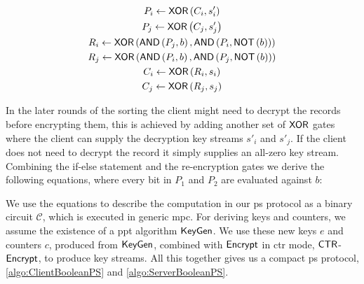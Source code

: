\begin{gather*}
    P_i \gets \mathsf{{XOR}} \left( C_i, s'_i \right) \\
    P_j \gets \mathsf{{XOR}} \left( C_j, s'_j \right) \\
    R_i \gets \mathsf{{XOR}} \left(\mathsf{{AND}} \left( P_j, b \right), \mathsf{{AND}} \left( P_i, \mathsf{{NOT}} \left( b \right) \right)\right) \\
    R_j \gets \mathsf{{XOR}} \left(\mathsf{{AND}} \left( P_i, b \right), \mathsf{{AND}} \left( P_j, \mathsf{{NOT}} \left( b \right) \right)\right) \\
    C_i \gets \mathsf{{XOR}} \left( R_i, s_i \right) \\
    C_j \gets \mathsf{{XOR}} \left( R_j, s_j \right)
\end{gather*}

In the later rounds of the sorting the client might need to decrypt the records before encrypting them, this is achieved by adding another set of $ \mathsf{{XOR}} $ gates where the client can supply the decryption key streams $ s'_i $ and $ s'_j $. If the client does not need to decrypt the record it simply supplies an all-zero key stream. Combining the if-else statement and the re-encryption gates we derive the following equations, where every bit in $ P_1 $ and $ P_2 $ are evaluated against $ b $:

We use the equations to describe the computation in our \acrshort{ps} protocol as a binary circuit $ \mathcal{C} $, which is executed in generic \acrshort{mpc}. For deriving keys and counters, we assume the existence of a \acrshort{ppt} algorithm $ \mathsf{{KeyGen}} $. We use these new keys $ e $ and counters $ c $, produced from $ \mathsf{{KeyGen}} $, combined with $ \mathsf{{Encrypt}} $ in \acrfull{ctr} mode, $ \mathsf{{CTR}} $-$ \mathsf{{Encrypt}} $, to produce key streams. All this together gives us a compact \acrshort{ps} protocol, \cref{algo:ClientBooleanPS} and \cref{algo:ServerBooleanPS}.

